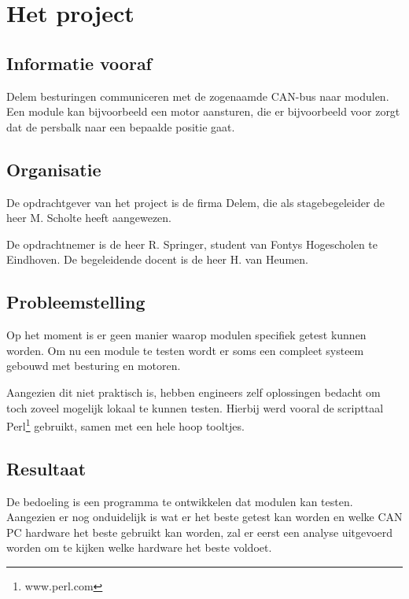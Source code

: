 \section{Het project}
\label{project}


\subsection{Informatie vooraf}


Delem besturingen communiceren met de zogenaamde CAN-bus naar modulen. Een module kan bijvoorbeeld een motor aansturen, die er bijvoorbeeld voor zorgt dat de persbalk naar een bepaalde positie gaat.

\subsection{Organisatie}
\label{organisatie}

De opdrachtgever van het project is de firma Delem, die als stagebegeleider de heer M. Scholte heeft aangewezen.

De opdrachtnemer is de heer R. Springer, student van Fontys Hogescholen te Eindhoven. De begeleidende docent is de heer H. van Heumen.

\subsection{Probleemstelling}

\label{probleemstelling}

Op het moment is er geen manier waarop modulen specifiek getest kunnen worden. Om nu een module te testen wordt er soms een compleet systeem gebouwd met besturing en motoren.

Aangezien dit niet praktisch is, hebben engineers zelf oplossingen bedacht om toch zoveel mogelijk lokaal te kunnen testen. Hierbij werd vooral de scripttaal Perl\footnote{www.perl.com} gebruikt, samen met een hele hoop tooltjes.

\subsection{Resultaat}

De bedoeling is een programma te ontwikkelen dat modulen kan testen. Aangezien er nog onduidelijk is wat er het beste getest kan worden en welke CAN PC hardware het beste gebruikt kan worden, zal er eerst een analyse uitgevoerd worden om te kijken welke hardware het beste voldoet.


